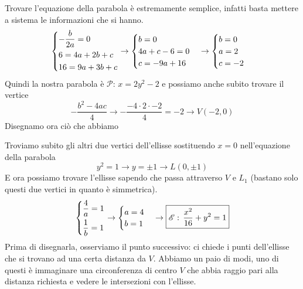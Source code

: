 Trovare l'equazione della parabola è estremamente semplice, infatti basta mettere a sistema le 
informazioni che si hanno.
\begin{equation*}
  \begin{dcases}
    -\frac{b}{2a} = 0\\
    6=4a+2b+c\\
    16=9a+3b+c
  \end{dcases}\rightarrow
  \begin{cases}
    b = 0\\
    4a+c-6=0\\
    c=-9a+16
  \end{cases}\rightarrow
  \begin{cases}
    b=0\\a=2\\c=-2
  \end{cases}
\end{equation*}
Quindi la nostra parabola è $\boxed{\mathscr{P}:\,x=2y^2-2}$ e possiamo anche subito trovare il 
vertice
\begin{equation*}
  -\frac{b^2-4ac}{4} \rightarrow -\frac{-4\cdot2\cdot-2}{4} = -2 \rightarrow V(-2,0)
\end{equation*}
Disegnamo ora ciò che abbiamo
\begin{center}
\end{center}
Troviamo subito gli altri due vertici dell'ellisse sostituendo $x=0$ nell'equazione della parabola
\begin{equation*}
  y^2=1 \rightarrow y = \pm 1 \rightarrow L(0,\pm1)
\end{equation*}
E ora possiamo trovare l'ellisse sapendo che passa attraverso $V$ e $L_1$ (bastano solo questi due
vertici in quanto è simmetrica).
\begin{equation*}
  \begin{dcases}
    \frac{4}{a}=1\\
    \frac{1}{b}=1
  \end{dcases} \rightarrow
  \begin{cases}
    a=4\\
    b=1
  \end{cases} \rightarrow \boxed{\mathscr{E}:\,\frac{x^2}{16}+y^2=1}
\end{equation*}
Prima di disegnarla, osserviamo il punto successivo: ci chiede i punti dell'ellisse che si trovano ad
una certa distanza da $V$. Abbiamo un paio di modi, uno di questi è immaginare una circonferenza di
centro $V$ che abbia raggio pari alla distanza richiesta e vedere le intersezioni con l'ellisse.

